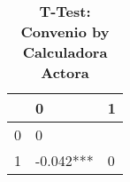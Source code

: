 \begin{table}[H]\centering \caption{\textbf{T-Test: Convenio by Calculadora Actora}}
\begin{tabular}{l*{2}{l}}
\toprule
                     & 0            & 1\\\midrule
0             &      0                   \\
1             & -0.042***    &      0    \\
\bottomrule\end{tabular}
\end{table}
